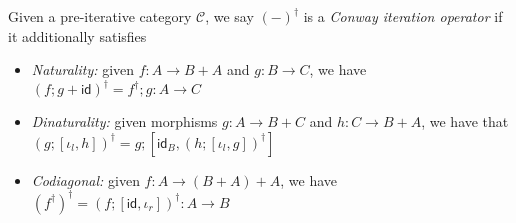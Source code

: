 \documentclass[acmsmall,screen,review]{acmart}
\newcommand{\mc}[1]{\ensuremath{\mathcal{#1}}}
\newcommand{\ms}[1]{\ensuremath{\mathsf{#1}}}
\begin{document}
\begin{definition}
  Given a pre-iterative category $\mc{C}$, we say $(-)^\dagger$ is a \emph{Conway iteration
  operator} if it additionally satisfies
  \begin{itemize}
    \item \emph{Naturality:} given $f : A \to B + A$ and $g : B \to C$, we have
      $
      (f;g + \ms{id})^\dagger = f^\dagger;g : A \to C
      $
    \item \emph{Dinaturality:} given morphisms $g : A \to B + C$ and $h : C \to B + A$, we have that
      $
      (g ; [\iota_l, h])^\dagger = g ; [\ms{id}_B, (h ; [\iota_l, g])^\dagger]
      $
    \item \emph{Codiagonal:} given $f : A \to (B + A) + A$, we have
      $
      (f^\dagger)^\dagger = (f;[\ms{id}, \iota_r])^\dagger : A \to B
      $
  \end{itemize}
\end{definition}
\end{document}
